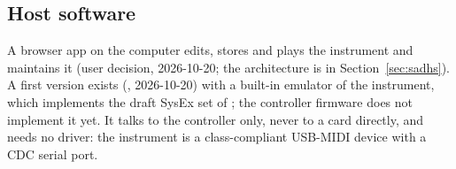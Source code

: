 \subsection{Host software}\label{sec:srshs}

A browser app on the computer edits, stores and plays the instrument and maintains it (user decision, 2026-10-20;
the architecture is in Section~\ref{sec:sadhs}). A first version exists (, 2026-10-20) with a built-in
emulator of the instrument, which implements the draft SysEx set of ; the controller firmware does
not implement it yet. It talks to the controller only, never to a card directly, and
needs no driver: the instrument is a class-compliant USB-MIDI device with a CDC serial port.

